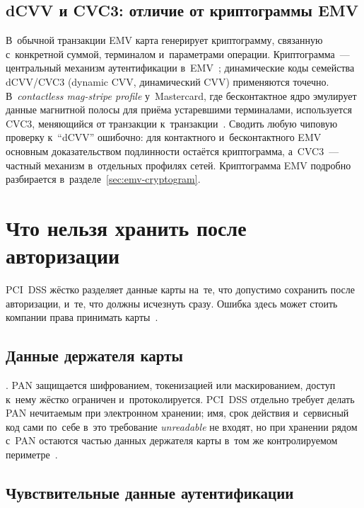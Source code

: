 \subsection*{dCVV и CVC3: отличие от криптограммы EMV}

В~обычной транзакции EMV карта генерирует криптограмму, связанную
с~конкретной суммой, терминалом и~параметрами операции. Криптограмма~---
центральный механизм аутентификации в~EMV~\cite{emvco-book3}; динамические коды
семейства dCVV/CVC3 (dynamic CVV, динамический CVV) применяются точечно.
В~\textit{contactless mag-stripe profile} у~Mastercard, где бесконтактное ядро
эмулирует данные магнитной полосы для приёма устаревшими терминалами,
используется CVC3, меняющийся от транзакции к~транзакции~\cite{mc-contactless-security}.
Сводить любую чиповую проверку к~\enquote{dCVV} ошибочно: для контактного
и~бесконтактного EMV основным доказательством подлинности остаётся
криптограмма, а~CVC3~--- частный механизм в~отдельных профилях сетей.
Криптограмма EMV подробно разбирается в~разделе~\ref{sec:emv-cryptogram}.

\section{Что нельзя хранить после авторизации}\label{sec:card-data-storage}

PCI~DSS жёстко разделяет данные карты на~те, что допустимо сохранить после
авторизации, и~те, что должны исчезнуть сразу. Ошибка здесь может стоить
компании права принимать карты~\cite{pci-dss-4}.

\subsection*{Данные держателя карты}

. PAN защищается шифрованием, токенизацией или
маскированием, доступ к~нему жёстко ограничен и~протоколируется.
PCI~DSS отдельно требует делать PAN нечитаемым при электронном хранении; имя,
срок действия и~сервисный код сами по~себе в~это требование \textit{unreadable}
не входят, но при хранении рядом с~PAN остаются частью данных держателя карты
в~том же контролируемом периметре~\cite{pci-dss-4,pci-faq-1222}.

\subsection*{Чувствительные данные аутентификации}

